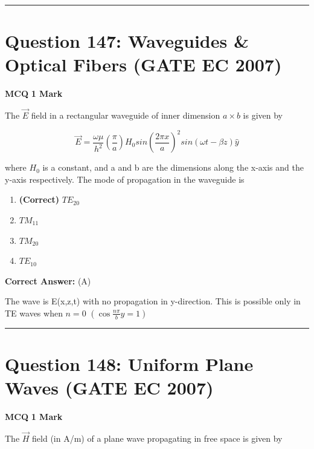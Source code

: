 \documentclass[11pt,a4paper]{article}
\begin{document}
\vspace{1.5em}
\hrule
\vspace{1.5em}

\section*{Question 147: Waveguides \& Optical Fibers (GATE EC 2007)}
\noindent \textbf{\color{primary}MCQ} \hfill \textbf{\color{secondary}1 Mark}


\noindent The $\vec{E}$ field in a rectangular waveguide of inner dimension $a \times b$
is given by 

\[
\vec{E}=\frac{\omega \mu }{h^{2}}(\frac{\pi}{a})H_{0}sin(\frac{2\pi x}{a})^{2}sin(\omega t-\beta z)\hat{y}
\]
 
where  $H_{0}$ is a constant, and a and b are the dimensions along the x-axis and the y-axis respectively. The mode of propagation in the waveguide is


\begin{enumerate}[label=(\Alph*)]
    \item \textbf{(Correct)} $TE_{20}$
    \item $TM_{11}$
    \item $TM_{20}$
    \item $TE_{10}$
\end{enumerate}

\noindent \textbf{Correct Answer:} (A)

\begin{tcolorbox}[solbox, title=Detailed Solution -- Question 147]
The wave is E(x,z,t) with no propagation in y-direction.
 This is possible only in TE waves when $n=0$
$\left(\cos \frac{n \pi}{b} y=1\right)$
\end{tcolorbox}

\vspace{1.5em}
\hrule
\vspace{1.5em}

\section*{Question 148: Uniform Plane Waves (GATE EC 2007)}
\noindent \textbf{\color{primary}MCQ} \hfill \textbf{\color{secondary}1 Mark}


\noindent The $\vec{H}$ field (in A/m) of a plane wave propagating in free space is given by 
 
\end{document}
